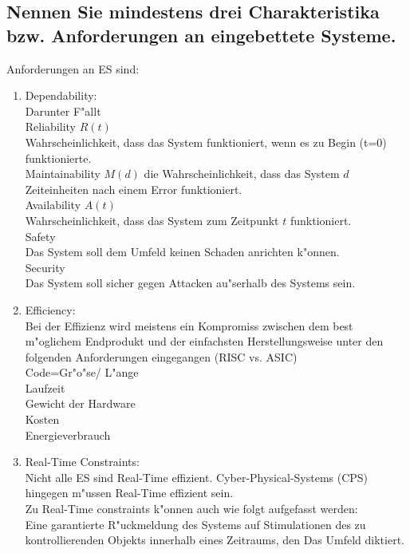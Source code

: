 \documentclass{article}
\begin{document}
\subsection{Nennen Sie mindestens drei Charakteristika bzw. Anforderungen an 
            eingebettete Systeme.}

Anforderungen an ES sind:\\
\begin{enumerate}
    \item Dependability:\\
          Darunter F"allt\\
          \subitem Reliability $R(t)$\\
                   Wahrscheinlichkeit, dass das System funktioniert, wenn es zu 
                   Begin (t=0) funktionierte.\\
          \subitem Maintainability $M(d)$
                   die Wahrscheinlichkeit, dass das System $d$ Zeiteinheiten nach 
                   einem Error funktioniert.\\
          \subitem Availability $A(t)$\\
                   Wahrscheinlichkeit, dass das System zum Zeitpunkt $t$ 
                   funktioniert.\\
          \subitem Safety\\
                   Das System soll dem Umfeld keinen Schaden anrichten k"onnen.\\
          \subitem Security\\
                   Das System soll sicher gegen Attacken au"serhalb des Systems
                   sein.\\
    \item Efficiency:\\
          Bei der Effizienz wird meistens ein Kompromiss zwischen dem best 
          m"oglichem Endprodukt und der einfachsten Herstellungsweise unter den
          folgenden Anforderungen eingegangen (RISC vs. ASIC)\\
          \subitem Code=Gr"o"se/ L"ange\\
          \subitem Laufzeit\\
          \subitem Gewicht der Hardware\\
          \subitem Kosten\\
          \subitem Energieverbrauch\\
    \item Real-Time Constraints:\\
          Nicht alle ES sind Real-Time effizient. Cyber-Physical-Systems (CPS)
          hingegen m"ussen Real-Time effizient sein.\\
          Zu Real-Time constraints k"onnen auch wie folgt aufgefasst werden:\\
          Eine garantierte R"uckmeldung des Systems auf Stimulationen des zu
          kontrollierenden Objekts innerhalb eines Zeitraums, den Das Umfeld
          diktiert.\\
\end{enumerate}
\end{document}
